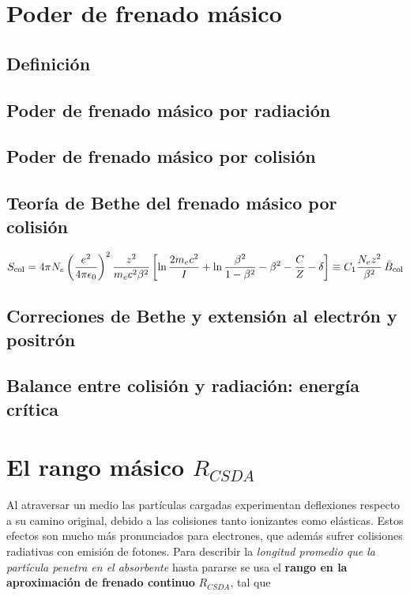 \section{Poder de frenado másico}



\subsection{Definición}

\subsection{Poder de frenado másico por radiación}


\subsection{Poder de frenado másico por colisión}


\subsection{Teoría de Bethe del frenado másico por colisión}

\begin{equation}
S_\text{\text{col}} = 4\pi N_e \left( \frac{e^2}{4\pi \epsilon_0} \right)^2 
        \frac{z^2}{m_e c^2 \beta^2} 
        \left[ \ln \frac{2 m_e c^2}{I} + \ln \frac{\beta^2}{1 - \beta^2} - \beta^2 - \frac{C}{Z} - \delta \right]
        \equiv C_1 \frac{N_e z^2}{\beta^2} \, \bar{B}_\text{\text{col}}
\end{equation}

\subsection{Correciones de Bethe y extensión al electrón y positrón}

\subsection{Balance entre colisión y radiación: energía crítica}


\section{El rango másico $R_{CSDA}$}

Al atraversar un medio las partículas cargadas experimentan deflexiones respecto a su camino original, debido a las colisiones tanto ionizantes como elásticas. Estos efectos son mucho más pronunciados para electrones, que además sufrer colisiones radiativas con emisión de fotones. Para describir la \textit{longitud promedio que la partícula penetra en el absorbente} hasta pararse se usa el \textbf{rango en la aproximación de frenado continuo} $R_{CSDA}$, tal que 

